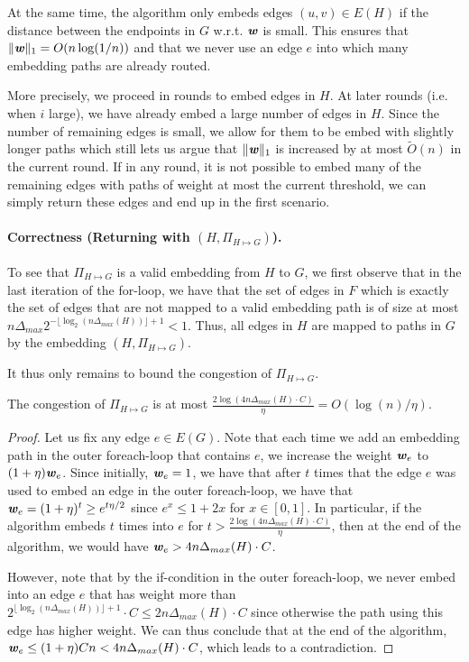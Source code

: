 At the same time, the algorithm only embeds edges $(u,v) \in E(H)$ if the distance between the endpoints in $G$ w.r.t. $\boldsymbol{\mathit{w}}$ is small. This ensures that $\|\boldsymbol{\mathit{w}}\|_1 = O(n \log(1/n))$ and that we never use an edge $e$ into which many embedding paths are already routed. 

More precisely, we proceed in rounds to embed edges in $H$. At later rounds (i.e. when $i$ large), we have already embed a large number of edges in $H$. Since the number of remaining edges is small, we allow for them to be embed with slightly longer paths which still lets us argue that $\|\boldsymbol{\mathit{w}}\|_1$ is increased by at most $\tilde{O}(n)$ in the current round. If in any round, it is not possible to embed many of the remaining edges with paths of weight at most the current threshold, we can simply return these edges and end up in the first scenario.


\paragraph{Correctness (Returning with $(H, \Pi_{H \mapsto G})$).} To see that $\Pi_{H \mapsto G}$ is a valid embedding from $H$ to $G$, we first observe that in the last iteration of the for-loop, we have that the set of edges in $F$ which is exactly the set of edges that are not mapped to a valid embedding path is of size at most $n\Delta_{max} 2^{- \lfloor \log_2(n\Delta_{max}(H)) \rfloor +1} < 1$. Thus, all edges in $H$ are mapped to paths in $G$ by the embedding $(H, \Pi_{H \mapsto G})$.

It thus only remains to bound the congestion of $\Pi_{H \mapsto G}$.

\begin{lemma}\label{lma:congestion}
The congestion of $\Pi_{H \mapsto G}$ is at most $\frac{2\log(4n \Delta_{max}(H) \cdot C)}{\eta} = O(\log(n)/\eta)$.
\end{lemma}
\begin{proof}
Let us fix any edge $e \in E(G)$. Note that each time we add an embedding path in the outer foreach-loop that contains $e$, we increase the weight $\boldsymbol{\mathit{w}}_e$ to $(1+\eta)\boldsymbol{\mathit{w}}_e$. Since initially, $\boldsymbol{\mathit{w}}_e = 1$, we have that after $t$ times that the edge $e$ was used to embed an edge in the outer foreach-loop, we have that $\boldsymbol{\mathit{w}}_e = (1+\eta)^t \geq e^{t\eta/2}$ since $e^x \leq 1+2x$ for $x \in [0,1]$. In particular, if the algorithm embeds $t$ times into $e$ for $t > \frac{2\log(4n \Delta_{max}(H) \cdot C)}{\eta}$, then at the end of the algorithm, we would have $\boldsymbol{\mathit{w}}_e > 4n \Delta_{max}(H) \cdot C$.

However, note that by the if-condition in the outer foreach-loop, we never embed into an edge $e$ that has weight more than $2^{\lfloor \log_2(n\Delta_{max}(H)) \rfloor +1} \cdot C \leq 2n \Delta_{max}(H) \cdot C$ since otherwise the path using this edge has higher weight. We can thus conclude that at the end of the algorithm, $\boldsymbol{\mathit{w}}_e \leq (1+\eta)C  n < 4n \Delta_{max}(H) \cdot C$, which leads to a contradiction. 
\end{proof}

